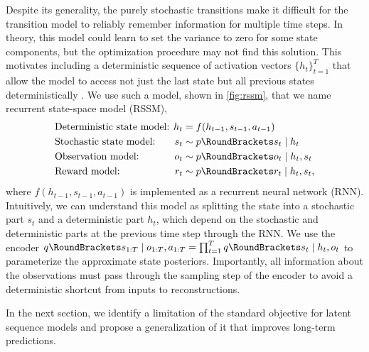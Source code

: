 Despite its generality, the purely stochastic transitions make it difficult for the transition model to reliably remember information for multiple time steps. In theory, this model could learn to set the variance to zero for some state components, but the optimization procedure may not find this solution. This motivates including a deterministic sequence of activation vectors $\{h_t\}_{t=1}^T$ that allow the model to access not just the last state but all previous states deterministically \citep{chung2015vrnn,buesing2018dssm}. We use such a model, shown in \cref{fig:rssm}, that we name recurrent state-space model (RSSM),
\begin{gather}
\begin{aligned}
\makebox[11em][l]{Deterministic state model:} && h_t &=f(h_{t-1},s_{t-1},a_{t-1}) \\
\makebox[11em][l]{Stochastic state model:} && s_t &\sim\p(s_t|h_t) \\
\makebox[11em][l]{Observation model:} && o_t &\sim\p(o_t|h_t,s_t) \\
\makebox[11em][l]{Reward model:} && r_t &\sim\p(r_t|h_t,s_t),
\end{aligned}
\raisetag{2.5\baselineskip}
\label{eq:rssm}
\end{gather}%
where $f(h_{t-1},s_{t-1},a_{t-1})$ is implemented as a recurrent neural network (RNN). Intuitively, we can understand this model as splitting the state into a stochastic part $s_t$ and a deterministic part $h_t$, which depend on the stochastic and deterministic parts at the previous time step through the RNN. We use the encoder $\q(s_{1:T}|o_{1:T},a_{1:T})=\prod_{t=1}^T \q(s_t|h_t,o_t)$ to parameterize the approximate state posteriors. Importantly, all information about the observations must pass through the sampling step of the encoder to avoid a deterministic shortcut from inputs to reconstructions.

In the next section, we identify a limitation of the standard objective for latent sequence models and propose a generalization of it that improves long-term predictions.
